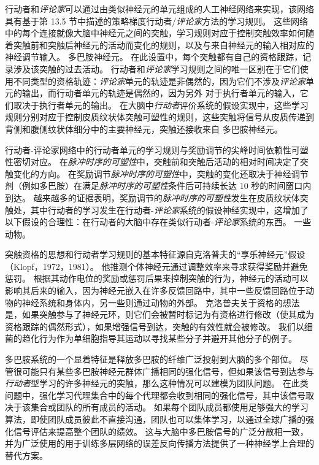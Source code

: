 行动者和\textit{评论家}可以通过由类似神经元的单元组成的人工神经网络来实现，该网络具有基于第 13.5 节中描述的策略梯度行动者/\textit{评论家}方法的学习规则。
这些网络中的每个连接就像大脑中神经元之间的突触，学习规则对应于控制突触效率如何随着突触前和突触后神经元的活动而变化的规则，以及与来自神经元的输入相对应的神经调节输入。
多巴胺神经元。
在此设置中，每个突触都有自己的资格跟踪，记录涉及该突触的过去活动。
行动者和\textit{评论家}学习规则之间的唯一区别在于它们使用不同类型的资格轨迹：\textit{评论家}单元的轨迹是非偶然的，因为它们不涉及\textit{评论家}单元的输出，而行动者单元的轨迹是偶然的，因为另外 对于执行者单元的输入，它们取决于执行者单元的输出。
在大脑中\textit{行动者}评价系统的假设实现中，这些学习规则分别对应于控制皮质纹状体突触可塑性的规则，这些突触将信号从皮质传递到背侧和腹侧纹状体细分中的主要神经元，突触还接收来自 多巴胺神经元。


行动者-评论家网络中的行动者单元的学习规则与奖励调节的尖峰时间依赖性可塑性密切对应。
在\textit{脉冲时序的可塑性}中，突触前和突触后活动的相对时间决定了突触变化的方向。
在奖励调节\textit{脉冲时序的可塑性}中，突触的变化还取决于神经调节剂（例如多巴胺）在满足\textit{脉冲时序的可塑性}条件后可持续长达 10 秒的时间窗口内到达。
越来越多的证据表明，奖励调节的\textit{脉冲时序的可塑性}发生在皮质纹状体突触处，其中行动者的学习发生在行动者-\textit{评论家}系统的假设神经实现中，这增加了以下假设的合理性：在行动者的大脑中存在类似行动者-\textit{评论家}系统的东西。 一些动物。


突触资格的思想和行动者学习规则的基本特征源自克洛普夫的“享乐神经元”假设（Klopf，1972，1981）。
他推测个体神经元通过调整效率来寻求获得奖励并避免惩罚。
根据其动作电位的奖励或惩罚后果来控制突触的行为，神经元的活动可以影响其后来的输入，因为神经元嵌入在许多反馈回路中，其中一些反馈回路位于动物的神经系统和身体内，另一些则通过动物的外部。
克洛普夫关于资格的想法是，如果突触参与了神经元环，则它们会被暂时标记为有资格进行修改（使其成为资格跟踪的偶然形式），如果增强信号到达，突触的有效性就会被修改。
我们以细菌的趋化行为作为单细胞指导其运动以寻找某些分子并避开其他分子的例子。


多巴胺系统的一个显着特征是释放多巴胺的纤维广泛投射到大脑的多个部位。
尽管很可能只有某些多巴胺神经元群体广播相同的强化信号，但如果该信号到达参与\textit{行动者}型学习的许多神经元的突触，那么这种情况可以建模为团队问题。
在此类问题中，强化学习代理集合中的每个代理都会收到相同的强化信号，其中该信号取决于该集合或团队的所有成员的活动。
如果每个团队成员都使用足够强大的学习算法，即使团队成员彼此不直接沟通，团队也可以集体学习，以通过全球广播的强化信号评估来提高整个团队的绩效。
这与大脑中多巴胺信号的广泛分散相一致，并为广泛使用的用于训练多层网络的误差反向传播方法提供了一种神经学上合理的替代方案。



